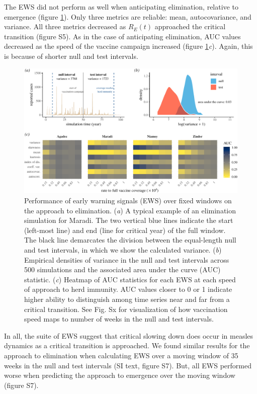 \documentclass[3p]{elsarticle} %
\makeatletter
\def\maxwidth{\ifdim\Gin@nat@width>\linewidth\linewidth
\else\Gin@nat@width\fi}
\let\Oldincludegraphics\includegraphics
\renewcommand{\includegraphics}[1]{\Oldincludegraphics[width=\maxwidth]{#1}}
\makeatother
\begin{document}
The EWS did not perform as well when anticipating elimination, relative
to emergence (figure \ref{elim-aucs}). Only three metrics are reliable:
mean, autocovariance, and variance. All three metrics decreased as
\(R_E(t)\) approached the critical transition (figure S5). As in the
case of anticipating elimination, AUC values decreased as the speed of
the vaccine campaign increased (figure \ref{elim-aucs}\emph{c}). Again,
this is because of shorter null and test intervals.

\begin{figure}
\centering
\includegraphics{measles-ews-manuscript_files/figure-latex/elimination-1.pdf}
\caption{Performance of early warning signals (EWS) over fixed windows
on the approach to elimination. (\emph{a}) A typical example of an
elimination simulation for Maradi. The two vertical blue lines indicate
the start (left-most line) and end (line for critical year) of the full
window. The black line demarcates the division between the equal-length
null and test intervals, in which we show the calculated variance.
(\emph{b}) Empirical densities of variance in the null and test
intervals across 500 simulations and the associated area under the curve
(AUC) statistic. (\emph{c}) Heatmap of AUC statistics for each EWS at
each speed of approach to herd immunity. AUC values closer to 0 or 1
indicate higher ability to distinguish among time series near and far
from a critical transition. See Fig. Sx for visualization of how
vaccination speed maps to number of weeks in the null and test
intervals. \label{elim-aucs}}
\end{figure}

In all, the suite of EWS suggest that critical slowing down does occur
in measles dynamics as a critical transition is approached. We found
similar results for the approach to elimination when calculating EWS
over a moving window of 35 weeks in the null and test intervals (SI
text, figure S7). But, all EWS performed worse when predicting the
approach to emergence over the moving window (figure S7).
\end{document}
